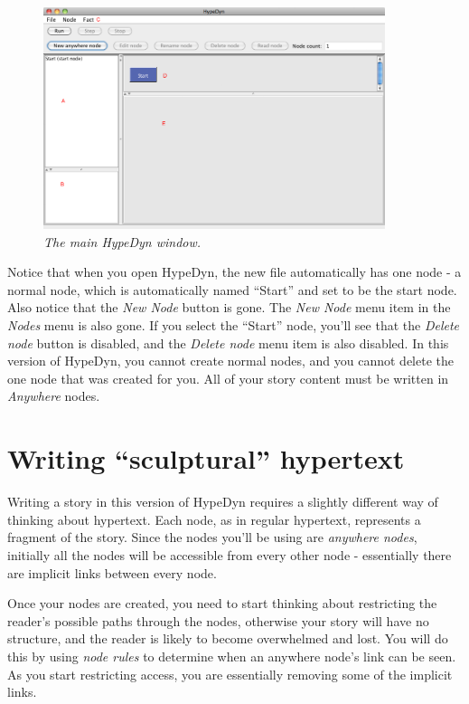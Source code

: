 \documentclass{article}
\begin{document}
\begin{figure}[h]
  \centering
  \includegraphics[width=10cm]{images/hypedyn-tutorial-3-figure-2}
  \caption{\textit{The main HypeDyn window.}}
\end{figure} 

Notice that when you open HypeDyn, the new file automatically has one node -
a normal node, which is automatically named ``Start'' and set to be the start
node. Also notice that the \textit{New Node} button is gone. The \textit{New Node} menu
item in the \textit{Nodes} menu is also gone. If you select the ``Start''
node, you'll see that the \textit{Delete node} button is disabled, and the
\textit{Delete node} menu item is also disabled. In this version of HypeDyn, you
cannot create normal nodes, and you cannot delete the one node that was created
for you. All of your story content must be written in \textit{Anywhere} nodes.

\section{Writing ``sculptural'' hypertext}

Writing a story in this version of HypeDyn requires a slightly different way of
thinking about hypertext. Each node, as in regular hypertext, represents a
fragment of the story. Since the nodes you'll be using are \textit{anywhere
nodes}, initially all the nodes will be accessible from every other node -
essentially there are implicit links between every node.

Once your nodes are created, you need to start thinking about restricting the
reader's possible paths through the nodes, otherwise your story will have no
structure, and the reader is likely to become overwhelmed and lost. You will do
this by using \textit{node rules} to determine when an anywhere node's link can
be seen. As you start restricting access, you are essentially removing some of
the implicit links.
\end{document}

